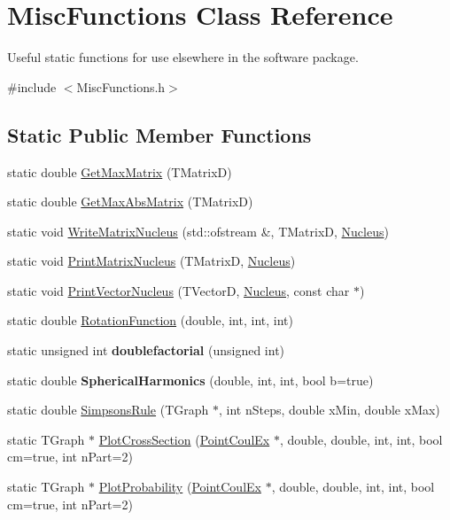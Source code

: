 \hypertarget{classMiscFunctions}{\section{Misc\-Functions Class Reference}
\label{classMiscFunctions}
}


Useful static functions for use elsewhere in the software package.  




{\ttfamily \#include $<$Misc\-Functions.\-h$>$}

\subsection*{Static Public Member Functions}
\begin{DoxyCompactItemize}
\item 
static double \hyperlink{classMiscFunctions_a94aa5dcad8b420d3b3e09554d42d8fc8}{Get\-Max\-Matrix} (T\-Matrix\-D)
\item 
static double \hyperlink{classMiscFunctions_a013c73579d32d966d225b96304d39dda}{Get\-Max\-Abs\-Matrix} (T\-Matrix\-D)
\item 
static void \hyperlink{classMiscFunctions_a53cef6044e7ce41d37789c2c76948226}{Write\-Matrix\-Nucleus} (std\-::ofstream \&, T\-Matrix\-D, \hyperlink{classNucleus}{Nucleus})
\item 
static void \hyperlink{classMiscFunctions_af49d629dced5a9125091a92bed3a4a0e}{Print\-Matrix\-Nucleus} (T\-Matrix\-D, \hyperlink{classNucleus}{Nucleus})
\item 
static void \hyperlink{classMiscFunctions_a6c137b98015696ba93abab4f31bcbb6b}{Print\-Vector\-Nucleus} (T\-Vector\-D, \hyperlink{classNucleus}{Nucleus}, const char $\ast$)
\item 
static double \hyperlink{classMiscFunctions_a91d1bb1bc78782da9523392de913efe9}{Rotation\-Function} (double, int, int, int)
\item 
\hypertarget{classMiscFunctions_aa0737f75b4e2e511f67e51fd51f1a897}{static unsigned int {\bfseries doublefactorial} (unsigned int)}\label{classMiscFunctions_aa0737f75b4e2e511f67e51fd51f1a897}

\item 
\hypertarget{classMiscFunctions_a8d5d0375b3d7f48877572368e1cd605f}{static double {\bfseries Spherical\-Harmonics} (double, int, int, bool b=true)}\label{classMiscFunctions_a8d5d0375b3d7f48877572368e1cd605f}

\item 
static double \hyperlink{classMiscFunctions_a0fdc08c8589cdeb940e62bf5f95f29d6}{Simpsons\-Rule} (T\-Graph $\ast$, int n\-Steps, double x\-Min, double x\-Max)
\item 
static T\-Graph $\ast$ \hyperlink{classMiscFunctions_a0c114db3ac783fc2c303ef6d715cbee9}{Plot\-Cross\-Section} (\hyperlink{classPointCoulEx}{Point\-Coul\-Ex} $\ast$, double, double, int, int, bool cm=true, int n\-Part=2)
\item 
static T\-Graph $\ast$ \hyperlink{classMiscFunctions_a979724afe1aa04bce4071b323a93bdd1}{Plot\-Probability} (\hyperlink{classPointCoulEx}{Point\-Coul\-Ex} $\ast$, double, double, int, int, bool cm=true, int n\-Part=2)
\end{DoxyCompactItemize}
